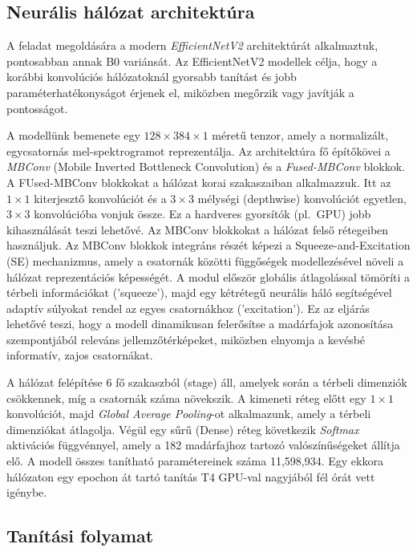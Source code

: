\documentclass[journal]{IEEEtran}
\begin{document}
  \subsection{Neurális hálózat architektúra}

  A feladat megoldására a modern \emph{EfficientNetV2} architektúrát \cite{tan2021} alkalmaztuk, pontosabban annak B0 variánsát. Az EfficientNetV2 modellek célja, hogy a korábbi konvolúciós hálózatoknál gyorsabb tanítást és jobb paraméterhatékonyságot érjenek el, miközben megőrzik vagy javítják a pontosságot.

  A modellünk bemenete egy $128 \times 384 \times 1$ méretű tenzor, amely a normalizált, egycsatornás mel-spektrogramot reprezentálja. Az architektúra fő építőkövei a \emph{MBConv} (Mobile Inverted Bottleneck Convolution) és a \emph{Fused-MBConv} blokkok. A FUsed-MBConv blokkokat a hálózat korai szakaszaiban alkalmazzuk. Itt az $1 \times 1$ kiterjesztő konvolúciót és a $3 \times 3$ mélységi (depthwise) konvolúciót egyetlen, $3 \times 3$ konvolúcióba vonjuk össze. Ez a hardveres gyorsítók (pl.~GPU) jobb kihasználását teszi lehetővé. Az MBConv blokkokat a hálózat felső rétegeiben használjuk. Az MBConv blokkok integráns részét képezi a Squeeze-and-Excitation (SE) mechanizmus, amely a csatornák közötti függőségek modellezésével növeli a hálózat reprezentációs képességét. A modul először globális átlagolással tömöríti a térbeli információkat ('squeeze'), majd egy kétrétegű neurális háló segítségével adaptív súlyokat rendel az egyes csatornákhoz ('excitation'). Ez az eljárás lehetővé teszi, hogy a modell dinamikusan felerősítse a madárfajok azonosítása szempontjából releváns jellemzőtérképeket, miközben elnyomja a kevésbé informatív, zajos csatornákat.

  A hálózat felépítése 6 fő szakaszból (stage) áll, amelyek során a térbeli dimenziók csökkennek, míg a csatornák száma növekszik. A kimeneti réteg előtt egy $1 \times 1$ konvolúciót, majd \emph{Global Average Pooling}-ot alkalmazunk, amely a térbeli dimenziókat átlagolja. Végül egy sűrű (Dense) réteg következik \emph{Softmax} aktivációs függvénnyel, amely a 182 madárfajhoz tartozó valószínűségeket állítja elő. A modell összes tanítható paramétereinek száma 11,598,934. Egy ekkora hálózaton egy epochon át tartó tanítás T4 GPU-val nagyjából fél órát vett igénybe.

 \subsection{Tanítási folyamat}
\end{document}
